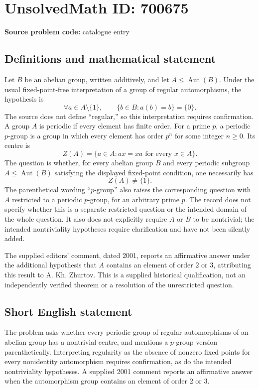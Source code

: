 \documentclass[11pt]{article}
\begin{document}
\section*{UnsolvedMath ID: 700675}
\textbf{Source problem code:} catalogue entry
\subsection{Definitions and mathematical statement}
Let \(B\) be an abelian group, written additively, and let \(A\leq\operatorname{Aut}(B)\). Under the usual fixed-point-free interpretation of a group of regular automorphisms, the hypothesis is
\[
\forall a\in A\setminus\{1\},\qquad \{b\in B:a(b)=b\}=\{0\}.
\]
The source does not define ``regular,'' so this interpretation requires confirmation. A group \(A\) is periodic if every element has finite order. For a prime \(p\), a periodic \(p\)-group is a group in which every element has order \(p^n\) for some integer \(n\geq0\). Its centre is
\[
Z(A)=\{a\in A:ax=xa\text{ for every }x\in A\}.
\]
The question is whether, for every abelian group \(B\) and every periodic subgroup \(A\leq\operatorname{Aut}(B)\) satisfying the displayed fixed-point condition, one necessarily has
\[
Z(A)\neq\{1\}.
\]
The parenthetical wording ``\(p\)-group'' also raises the corresponding question with \(A\) restricted to a periodic \(p\)-group, for an arbitrary prime \(p\). The record does not specify whether this is a separate restricted question or the intended domain of the whole question. It also does not explicitly require \(A\) or \(B\) to be nontrivial; the intended nontriviality hypotheses require clarification and have not been silently added.

The supplied editors' comment, dated 2001, reports an affirmative answer under the additional hypothesis that \(A\) contains an element of order \(2\) or \(3\), attributing this result to A. Kh. Zhurtov. This is a supplied historical qualification, not an independently verified theorem or a resolution of the unrestricted question.
\subsection{Short English statement}
The problem asks whether every periodic group of regular automorphisms of an abelian group has a nontrivial centre, and mentions a \(p\)-group version parenthetically. Interpreting regularity as the absence of nonzero fixed points for every nonidentity automorphism requires confirmation, as do the intended nontriviality hypotheses. A supplied 2001 comment reports an affirmative answer when the automorphism group contains an element of order \(2\) or \(3\).
\end{document}
